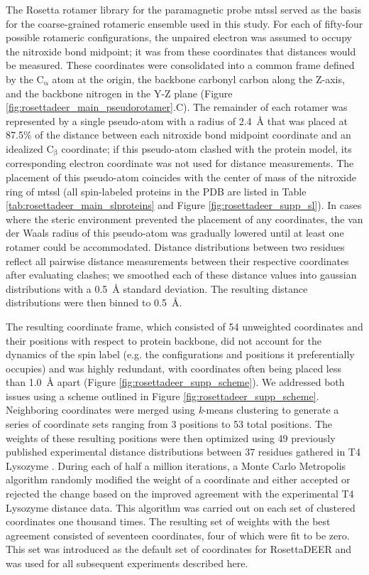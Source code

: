 The Rosetta rotamer library for the paramagnetic probe \gls{mtssl} \citep*{Alexander2013} served as the basis for the coarse-grained rotameric ensemble used in this study. For each of fifty-four possible rotameric configurations, the unpaired electron was assumed to occupy the nitroxide bond midpoint; it was from these coordinates that distances would be measured. These coordinates were consolidated into a common frame defined by the $\mathrm{C_{\upalpha}}$ atom at the origin, the backbone carbonyl carbon along the Z-axis, and the backbone nitrogen in the Y-Z plane (Figure \ref{fig:rosettadeer_main_pseudorotamer}.C). The remainder of each rotamer was represented by a single pseudo-atom with a radius of \SI{2.4}{\angstrom} that was placed at 87.5\% of the distance between each nitroxide bond midpoint coordinate and an idealized $\mathrm{C_{\upbeta}}$ coordinate; if this pseudo-atom clashed with the protein model, its corresponding electron coordinate was not used for distance measurements. The placement of this pseudo-atom coincides with the center of mass of the nitroxide ring of \gls{mtssl} (all spin-labeled proteins in the PDB are listed in Table \ref{tab:rosettadeer_main_slproteins} and Figure \ref{fig:rosettadeer_supp_sl}). In cases where the steric environment prevented the placement of any coordinates, the van der Waals radius of this pseudo-atom was gradually lowered until at least one rotamer could be accommodated. Distance distributions between two residues reflect all pairwise distance measurements between their respective coordinates after evaluating clashes; we smoothed each of these distance values into gaussian distributions with a \SI{0.5}{\angstrom} standard deviation. The resulting distance distributions were then binned to \SI{0.5}{\angstrom}.

The resulting coordinate frame, which consisted of 54 unweighted coordinates and their positions with respect to protein backbone, did not account for the dynamics of the spin label (e.g. the configurations and positions it preferentially occupies) and was highly redundant, with coordinates often being placed less than \SI{1.0}{\angstrom} apart (Figure \ref{fig:rosettadeer_supp_scheme}). We addressed both issues using a scheme outlined in Figure \ref{fig:rosettadeer_supp_scheme}. Neighboring coordinates were merged using \emph{k}-means clustering to generate a series of coordinate sets ranging from 3 positions to 53 total positions. The weights of these resulting positions were then optimized using 49 previously published experimental distance distributions between 37 residues gathered in T4 Lysozyme \citep*{Islam2013}. During each of half a million iterations, a Monte Carlo Metropolis algorithm randomly modified the weight of a coordinate and either accepted or rejected the change based on the improved agreement with the experimental T4 Lysozyme distance data. This algorithm was carried out on each set of clustered coordinates one thousand times. The resulting set of weights with the best agreement consisted of seventeen coordinates, four of which were fit to be zero. This set was introduced as the default set of coordinates for RosettaDEER and was used for all subsequent experiments described here.

